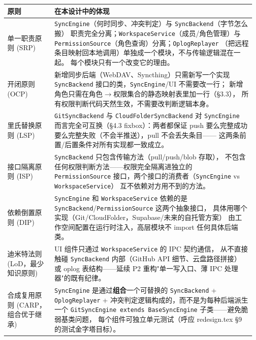 \documentclass[12pt, a4paper]{article}
\begin{document}
\begin{longtable}{p{2.6cm} p{9.9cm}}
  \toprule
  \textbf{原则} & \textbf{在本设计中的体现} \\
  \midrule
  单一职责原则 \newline (SRP) &
    \texttt{SyncEngine}（何时同步、冲突判定）与 \texttt{SyncBackend}（字节怎么搬）
    职责完全分离；\texttt{WorkspaceService}（成员/角色管理）与
    \texttt{PermissionSource}（角色查询）分离；\texttt{OplogReplayer}
    （把远程条目映射回本地调用）单独成一个模块，不与传输逻辑混在一起。
    每个模块只有一个改变它的理由。 \\
  \midrule
  开闭原则 \newline (OCP) &
    新增同步后端（WebDAV、Syncthing）只需新写一个实现
    \texttt{SyncBackend} 接口的类，\texttt{SyncEngine}/UI 不需要改一行；
    新增角色只需在角色$\to$权限集合的静态映射表里加一行（\S3.3），
    所有权限判断代码天然生效，不需要改判断逻辑本身。 \\
  \midrule
  里氏替换原则 \newline (LSP) &
    \texttt{GitSyncBackend} 与 \texttt{CloudFolderSyncBackend} 对
    \texttt{SyncEngine} 而言完全可互换（\S4.3 fixbox）：两者都保证
    push 要么完整成功要么完整失败（不会半推送），pull 不会丢失条目——
    这两条前置/后置条件对所有实现都一致成立。 \\
  \midrule
  接口隔离原则 \newline (ISP) &
    \texttt{SyncBackend} 只包含传输方法（pull/push/blob 存取），
    不包含任何权限判断方法——权限完全隔离进独立的 \texttt{PermissionSource}
    接口，两个接口的消费者（\texttt{SyncEngine} vs \texttt{WorkspaceService}）
    互不依赖对方用不到的方法。 \\
  \midrule
  依赖倒置原则 \newline (DIP) &
    \texttt{SyncEngine} 和 \texttt{WorkspaceService} 依赖的是
    \texttt{SyncBackend}/\texttt{PermissionSource} 这两个抽象接口，
    具体用哪个实现（Git/CloudFolder，Supabase/未来的自托管方案）
    由工作空间配置在运行时注入，高层模块不 import 任何具体后端类。 \\
  \midrule
  迪米特法则 \newline (LoD，最少知识原则) &
    UI 组件只通过 \texttt{WorkspaceService} 的 IPC 契约通信，
    从不直接触碰 \texttt{SyncBackend} 内部（GitHub API 细节、云盘路径拼接）
    或 oplog 表结构——延续 P2 重构"单一写入口、薄 IPC 处理器"的既有纪律。 \\
  \midrule
  合成复用原则 \newline (CARP，组合优于继承) &
    \texttt{SyncEngine} 是通过\textbf{组合}一个可替换的 \texttt{SyncBackend} +
    \texttt{OplogReplayer} + 冲突判定逻辑构成的，而不是为每种后端派生一个
    \texttt{GitSyncEngine extends BaseSyncEngine} 子类——避免脆弱基类问题，
    每个组件可独立单元测试（呼应 redesign.tex \S9 的测试金字塔目标）。 \\
  \bottomrule
\end{longtable}
\end{document}
